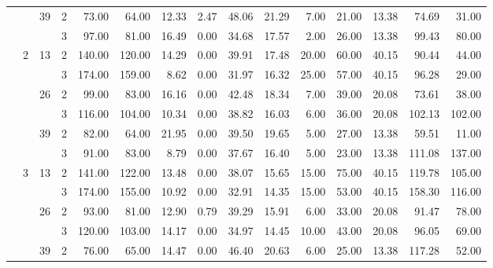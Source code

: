 \begin{tabular}{llllrrrrrrrrrrr}
\cline{3-15}
               &   & \multirow{2}{*}{39} & 2 &    73.00 &     64.00 & 12.33 &    2.47 &   48.06 &   21.29 &    7.00 &   21.00 &   13.38 &  74.69 &    31.00 \\
               &   &    & 3 &    97.00 &     81.00 & 16.49 &    0.00 &   34.68 &   17.57 &    2.00 &   26.00 &   13.38 &  99.43 &    80.00 \\
\cline{2-15}
\cline{3-15}
               & \multirow{6}{*}{2} & \multirow{2}{*}{13} & 2 &   140.00 &    120.00 & 14.29 &    0.00 &   39.91 &   17.48 &   20.00 &   60.00 &   40.15 &  90.44 &    44.00 \\
               &   &    & 3 &   174.00 &    159.00 &  8.62 &    0.00 &   31.97 &   16.32 &   25.00 &   57.00 &   40.15 &  96.28 &    29.00 \\
\cline{3-15}
               &   & \multirow{2}{*}{26} & 2 &    99.00 &     83.00 & 16.16 &    0.00 &   42.48 &   18.34 &    7.00 &   39.00 &   20.08 &  73.61 &    38.00 \\
               &   &    & 3 &   116.00 &    104.00 & 10.34 &    0.00 &   38.82 &   16.03 &    6.00 &   36.00 &   20.08 & 102.13 &   102.00 \\
\cline{3-15}
               &   & \multirow{2}{*}{39} & 2 &    82.00 &     64.00 & 21.95 &    0.00 &   39.50 &   19.65 &    5.00 &   27.00 &   13.38 &  59.51 &    11.00 \\
               &   &    & 3 &    91.00 &     83.00 &  8.79 &    0.00 &   37.67 &   16.40 &    5.00 &   23.00 &   13.38 & 111.08 &   137.00 \\
\cline{2-15}
\cline{3-15}
               & \multirow{6}{*}{3} & \multirow{2}{*}{13} & 2 &   141.00 &    122.00 & 13.48 &    0.00 &   38.07 &   15.65 &   15.00 &   75.00 &   40.15 & 119.78 &   105.00 \\
               &   &    & 3 &   174.00 &    155.00 & 10.92 &    0.00 &   32.91 &   14.35 &   15.00 &   53.00 &   40.15 & 158.30 &   116.00 \\
\cline{3-15}
               &   & \multirow{2}{*}{26} & 2 &    93.00 &     81.00 & 12.90 &    0.79 &   39.29 &   15.91 &    6.00 &   33.00 &   20.08 &  91.47 &    78.00 \\
               &   &    & 3 &   120.00 &    103.00 & 14.17 &    0.00 &   34.97 &   14.45 &   10.00 &   43.00 &   20.08 &  96.05 &    69.00 \\
\cline{3-15}
               &   & \multirow{2}{*}{39} & 2 &    76.00 &     65.00 & 14.47 &    0.00 &   46.40 &   20.63 &    6.00 &   25.00 &   13.38 & 117.28 &    52.00 \\

\end{tabular}
